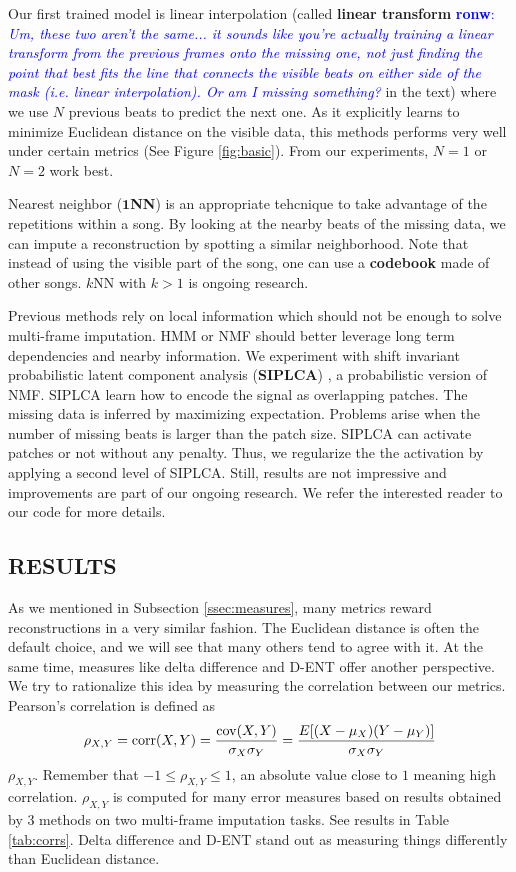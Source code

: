 \documentclass{article}
\newcommand{\FIXME}[2][FIXME]{\textcolor{blue}{\textbf{#1}: \emph{#2}}}
\begin{document}
Our first trained model is linear interpolation (called \textbf{linear
  transform} \FIXME[ronw]{Um, these two aren't the same...  it sounds
  like you're actually training a linear transform  from the previous
  frames onto the missing one, not just finding the point that best
  fits the line that connects the visible beats on either side of the
  mask (i.e. linear interpolation).  Or am I missing something?}
in the text) where we use $N$ previous beats to predict
the next one.  As it explicitly learns to minimize Euclidean distance
on the visible data, this methods performs very well under certain
metrics (See Figure \ref{fig:basic}). From our experiments, $N=1$ or
$N=2$ work best.

Nearest neighbor ($\mathbf{1}$\textbf{NN}) is an appropriate tehcnique
to take advantage of the repetitions within a song. By looking at the
nearby beats of the missing data, we can impute a reconstruction by
spotting a similar neighborhood. Note that instead of using the
visible part of the song, one can use a \textbf{codebook} made of
other songs.  $k$NN with $k>1$ is ongoing research.

Previous methods rely on local information which should not be enough
to solve multi-frame imputation. HMM or NMF should better leverage
long term dependencies and nearby information.  We experiment with
shift invariant probabilistic latent component analysis
(\textbf{SIPLCA}) \cite{Smaragdis2009,Weiss2010}, a probabilistic
version of NMF. SIPLCA learn how to encode the signal as overlapping
patches. The missing data is inferred by maximizing expectation.
Problems arise when the number of missing beats is larger than the patch
size. SIPLCA can activate patches or not without any penalty. Thus, we
regularize the the activation by applying a second level of SIPLCA.
Still, results are not impressive and improvements are part of our
ongoing research. We refer the interested reader to our code for more
details.



\subsection{RESULTS}
\label{ssec:results}
As we mentioned in Subsection \ref{ssec:measures}, many metrics reward
reconstructions in a very similar fashion. The Euclidean distance is
often the default choice, and we will see that many others tend to agree
with it. At the same time, measures like delta difference and D-ENT
offer another perspective. We try to rationalize this idea by
measuring the correlation between our metrics. Pearson's
correlation is defined as
\[  \rho_{X,Y}=\mathrm{corr}(X,Y)={\mathrm{cov}(X,Y) \over \sigma_X
    \sigma_Y} ={E[(X-\mu_X)(Y-\mu_Y)] \over \sigma_X\sigma_Y}
\]
$\rho_{X,Y}$. Remember that $-1 \leq \rho_{X,Y} \leq 1$, an absolute
value close to $1$ meaning high correlation. $\rho_{X,Y}$ is computed
for many error measures based on results obtained by $3$ methods on
two multi-frame imputation tasks. See results in Table
\ref{tab:corrs}. Delta difference and D-ENT stand out as measuring
things differently than Euclidean distance.
\end{document}
